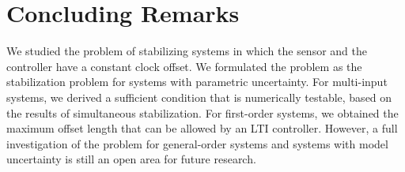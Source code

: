 \documentclass[letterpaper, 12pt, draftcls, onecolumn]{ieeeconf}
\begin{document}
\section{Concluding Remarks}
We studied the problem of stabilizing systems
in which the sensor and the controller have a constant
clock offset. 
We formulated the problem as the stabilization problem for systems with
parametric uncertainty.
For multi-input systems, we derived 
a sufficient condition that 
is numerically testable,
based on the results of simultaneous stabilization.
For first-order systems,
we obtained
the maximum offset length
that can be allowed by an LTI controller.
However, a full investigation of the problem 
for general-order systems 
and systems with model uncertainty  is still 
an open area for future research.
\end{document}
